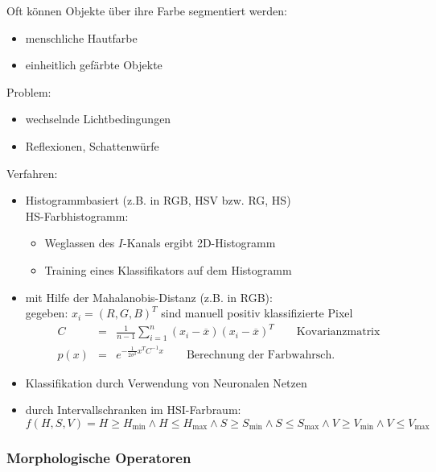 Oft können Objekte über ihre Farbe segmentiert werden:
\begin{itemize}
\item menschliche Hautfarbe
\item einheitlich gefärbte Objekte
\end{itemize}
Problem:
\begin{itemize}
\item wechselnde Lichtbedingungen
\item Reflexionen, Schattenwürfe
\end{itemize}
Verfahren:
\begin{itemize}
\item Histogrammbasiert (z.B. in RGB, HSV bzw. RG, HS) \\ HS-Farbhistogramm:
\begin{itemize}
\item Weglassen des $I$-Kanals ergibt 2D-Histogramm
\item Training eines Klassifikators auf dem Histogramm
\end{itemize}
\item mit Hilfe der Mahalanobis-Distanz (z.B. in RGB): \\ gegeben: $x_i = (R,G,B)^T$ sind manuell positiv klassifizierte Pixel
\begin{eqnarray*}
C &=& \frac{1}{n-1} \sum\limits_{i=1}^n (x_i - \overline{x})(x_i - \overline{x})^T \qquad \textrm{Kovarianzmatrix} \\ p(x) &=& e^{- \frac{1}{2 \sigma^2} x^T C^{-1} x} \qquad \textrm{Berechnung der Farbwahrsch.}
\end{eqnarray*}
\item Klassifikation durch Verwendung von Neuronalen Netzen
\item durch Intervallschranken im HSI-Farbraum:
$$f(H,S,V) = H \geq H_{\min} \wedge H \leq H_{\max} \wedge S \geq S_{\min} \wedge S \leq S_{\max} \wedge V \geq V_{\min} \wedge V \leq V_{\max}$$
\end{itemize}

\subsubsection*{Morphologische Operatoren}


